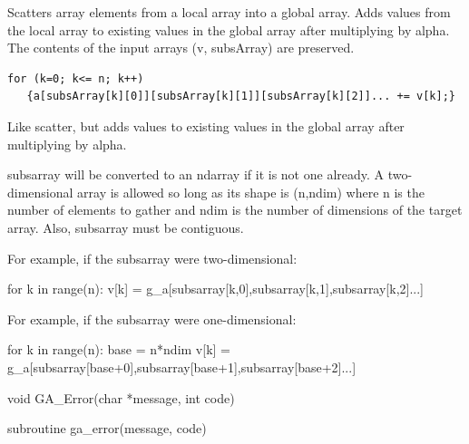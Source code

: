 \documentclass[10pt]{article}
\begin{document}
\ncoll

\begin{desc}

Scatters array elements from a local array into a global array. Adds values
from the local array to existing values in the global array after multiplying
by alpha. The contents of the input arrays (v, subsArray) are preserved.

\begin{verbatim}
for (k=0; k<= n; k++)
   {a[subsArray[k][0]][subsArray[k][1]][subsArray[k][2]]... += v[k];}
\end{verbatim}

Like scatter, but adds values to existing values in the global array after
multiplying by alpha.

\end{desc}

\begin{pydesc}

subsarray will be converted to an ndarray if it is not one already. A
two-dimensional array is allowed so long as its shape is (n,ndim) where n is
the number of elements to gather and ndim is the number of dimensions of the
target array. Also, subsarray must be contiguous.

For example, if the subsarray were two-dimensional:

for k in range(n):
    v[k] = g_a[subsarray[k,0],subsarray[k,1],subsarray[k,2]...]

For example, if the subsarray were one-dimensional:

for k in range(n):
    base = n*ndim
    v[k] = g_a[subsarray[base+0],subsarray[base+1],subsarray[base+2]...]

\end{pydesc}



\begin{capi}
\begin{ccode}
void GA_Error(char *message, int code)
\end{ccode}
\begin{funcargs}
\end{funcargs}
\end{capi}

\begin{fapi}
\begin{fcode}
subroutine ga_error(message, code)
\end{fcode}
\begin{funcargs}
\end{funcargs}
\end{fapi}
\end{document}
